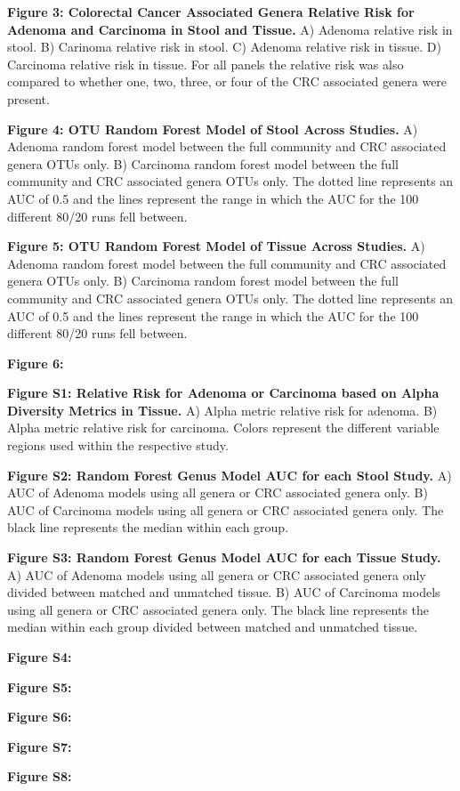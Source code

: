 \documentclass[12pt,]{article}
\begin{document}
\textbf{Figure 3: Colorectal Cancer Associated Genera Relative Risk for
Adenoma and Carcinoma in Stool and Tissue.} A) Adenoma relative risk in
stool. B) Carinoma relative risk in stool. C) Adenoma relative risk in
tissue. D) Carcinoma relative risk in tissue. For all panels the
relative risk was also compared to whether one, two, three, or four of
the CRC associated genera were present.

\textbf{Figure 4: OTU Random Forest Model of Stool Across Studies.} A)
Adenoma random forest model between the full community and CRC
associated genera OTUs only. B) Carcinoma random forest model between
the full community and CRC associated genera OTUs only. The dotted line
represents an AUC of 0.5 and the lines represent the range in which the
AUC for the 100 different 80/20 runs fell between.

\textbf{Figure 5: OTU Random Forest Model of Tissue Across Studies.} A)
Adenoma random forest model between the full community and CRC
associated genera OTUs only. B) Carcinoma random forest model between
the full community and CRC associated genera OTUs only. The dotted line
represents an AUC of 0.5 and the lines represent the range in which the
AUC for the 100 different 80/20 runs fell between.

\textbf{Figure 6: }

\newpage

\textbf{Figure S1: Relative Risk for Adenoma or Carcinoma based on Alpha
Diversity Metrics in Tissue.} A) Alpha metric relative risk for adenoma.
B) Alpha metric relative risk for carcinoma. Colors represent the
different variable regions used within the respective study.

\textbf{Figure S2: Random Forest Genus Model AUC for each Stool Study.}
A) AUC of Adenoma models using all genera or CRC associated genera only.
B) AUC of Carcinoma models using all genera or CRC associated genera
only. The black line represents the median within each group.

\textbf{Figure S3: Random Forest Genus Model AUC for each Tissue Study.}
A) AUC of Adenoma models using all genera or CRC associated genera only
divided between matched and unmatched tissue. B) AUC of Carcinoma models
using all genera or CRC associated genera only. The black line
represents the median within each group divided between matched and
unmatched tissue.

\textbf{Figure S4: }

\textbf{Figure S5: }

\textbf{Figure S6: }

\textbf{Figure S7: }

\textbf{Figure S8: }

\newpage
\end{document}
